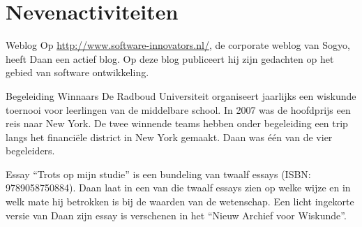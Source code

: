 \section*{Nevenactiviteiten}

	\begin{subActivityList}
		\item[Weblog] Op \url{http://www.software-innovators.nl/}, de corporate
		weblog van Sogyo, heeft Daan een actief blog. Op deze blog publiceert 
		hij zijn gedachten op het gebied van software ontwikkeling.
		\hfill\\
		
		\item[Begeleiding Winnaars] De Radboud Universiteit organiseert 
		jaarlijks een wiskunde toernooi voor leerlingen van de middelbare 
		school. In 2007 was de hoofdprijs een reis naar New York. De twee 
		winnende teams hebben onder begeleiding een trip langs het financi\"ele 
		district in New York gemaakt. Daan was \'e\'en van de vier begeleiders.
		\hfill\\
		
		\item[Essay] ``Trots op mijn studie'' is een bundeling van twaalf essays 
		(ISBN: 9789058750884). Daan laat in een van die twaalf essays zien op 
		welke wijze en in welk mate hij betrokken is bij de waarden van de 
		wetenschap.
		Een licht ingekorte versie van Daan zijn essay is verschenen in het 
		``Nieuw Archief voor Wiskunde''.		
		\hfill\\
	\end{subActivityList}

